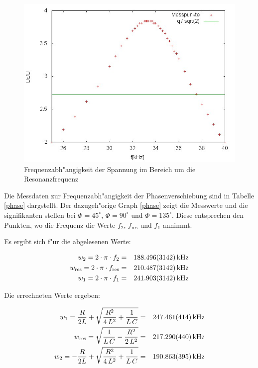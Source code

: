 	\begin{figure}[htbp]
		\centering
		\includegraphics[width = 12cm]{img/graph_c_1.jpg}
		\caption{Frequenzabh"angigkeit der Spannung im Bereich um die Resonanzfrequenz}
		\label{frequenz_2}
	\end{figure}

	Die Messdaten zur Frequenzabh"angigkeit der Phasenverschiebung sind in Tabelle \eqref{phase} dargstellt.
	Der dazugeh"orige Graph \eqref{phase} zeigt die Messwerte und die signifikanten stellen bei $\Phi = 45^\circ$, $\Phi = 90^\circ$ und $\Phi = 135^\circ$.
	Diese entsprechen den Punkten, wo die Frequenz die Werte $f_2$, $f_\mathrm{res}$ und $f_1$ annimmt.

	Es ergibt sich f"ur die abgelesenen Werte:

	\begin{eqnarray*}
		w_2 = 2 \cdot \pi \cdot f_2 &=& \SI{188.496 (3142)}{\kilo \hertz}\\
		w_\mathrm{res} = 2 \cdot \pi \cdot f_\mathrm{res} &=& \SI{210.487 (3142)}{\kilo \hertz}\\
		w_1 = 2 \cdot \pi \cdot f_1 &=& \SI{241.903 (3142)}{\kilo \hertz}
	\end{eqnarray*}

	Die errechneten Werte ergeben:

	\begin{eqnarray*}
		w_1 = \frac{R}{2L} + \sqrt{\frac{R^2}{4\,L^2} + \frac{1}{L \, C}} &=& \SI{247.461 (414)}{\kilo \hertz}\\
		w_\mathrm{res} = \sqrt{\frac{1}{L\, C} - \frac{R^2}{2 \, L^2}} &=& \SI{217.290 (440)}{\kilo \hertz}\\
		w_2 = -\frac{R}{2L} + \sqrt{\frac{R^2}{4\,L^2} + \frac{1}{L \, C}} &=& \SI{190.863 (395)}{\kilo \hertz}
	\end{eqnarray*}

